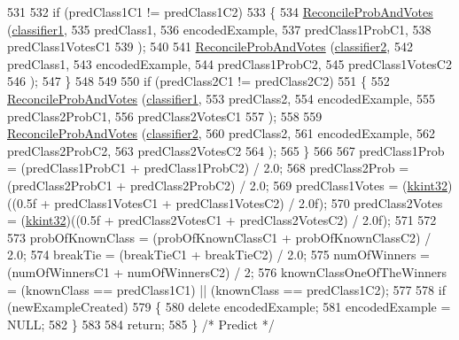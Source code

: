 \begin{DoxyCode}
531 
532   \textcolor{keywordflow}{if}  (predClass1C1 != predClass1C2)
533   \{
534     \hyperlink{class_k_k_m_l_l_1_1_model_dual_aca263119cde1cffcce22061d4c51016f}{ReconcileProbAndVotes} (\hyperlink{class_k_k_m_l_l_1_1_model_dual_a702b5e302cc05ab6cdc3ee4ae8115622}{classifier1},
535                            predClass1,
536                            encodedExample, 
537                            predClass1ProbC1,
538                            predClass1VotesC1
539                           );
540 
541     \hyperlink{class_k_k_m_l_l_1_1_model_dual_aca263119cde1cffcce22061d4c51016f}{ReconcileProbAndVotes} (\hyperlink{class_k_k_m_l_l_1_1_model_dual_a18ed538fadc0cb3eebdb9175ccce22e2}{classifier2},
542                            predClass1,
543                            encodedExample, 
544                            predClass1ProbC2,
545                            predClass1VotesC2
546                           );
547   \}
548 
549 
550   \textcolor{keywordflow}{if}  (predClass2C1 != predClass2C2)
551   \{
552     \hyperlink{class_k_k_m_l_l_1_1_model_dual_aca263119cde1cffcce22061d4c51016f}{ReconcileProbAndVotes} (\hyperlink{class_k_k_m_l_l_1_1_model_dual_a702b5e302cc05ab6cdc3ee4ae8115622}{classifier1},
553                            predClass2,
554                            encodedExample, 
555                            predClass2ProbC1,
556                            predClass2VotesC1
557                           );
558 
559     \hyperlink{class_k_k_m_l_l_1_1_model_dual_aca263119cde1cffcce22061d4c51016f}{ReconcileProbAndVotes} (\hyperlink{class_k_k_m_l_l_1_1_model_dual_a18ed538fadc0cb3eebdb9175ccce22e2}{classifier2},
560                            predClass2,
561                            encodedExample, 
562                            predClass2ProbC2,
563                            predClass2VotesC2
564                           );
565   \}
566 
567   predClass1Prob  = (predClass1ProbC1 + predClass1ProbC2) / 2.0;
568   predClass2Prob  = (predClass2ProbC1 + predClass2ProbC2) / 2.0;
569   predClass1Votes   = (\hyperlink{namespace_k_k_b_a8fa4952cc84fda1de4bec1fbdd8d5b1b}{kkint32})((0.5f + predClass1VotesC1 + predClass1VotesC2) / 2.0f);
570   predClass2Votes   = (\hyperlink{namespace_k_k_b_a8fa4952cc84fda1de4bec1fbdd8d5b1b}{kkint32})((0.5f + predClass2VotesC1 + predClass2VotesC2) / 2.0f);
571   
572 
573   probOfKnownClass  = (probOfKnownClassC1 + probOfKnownClassC2) / 2.0;
574   breakTie          = (breakTieC1         + breakTieC2)         / 2.0;
575   numOfWinners      = (numOfWinnersC1     + numOfWinnersC2)     / 2;
576   knownClassOneOfTheWinners = (knownClass == predClass1C1)  ||  (knownClass == predClass1C2);
577 
578   \textcolor{keywordflow}{if}  (newExampleCreated)
579   \{
580     \textcolor{keyword}{delete}  encodedExample;
581     encodedExample = NULL;
582   \}
583 
584   \textcolor{keywordflow}{return};
585 \}  \textcolor{comment}{/* Predict */}
\end{DoxyCode}

